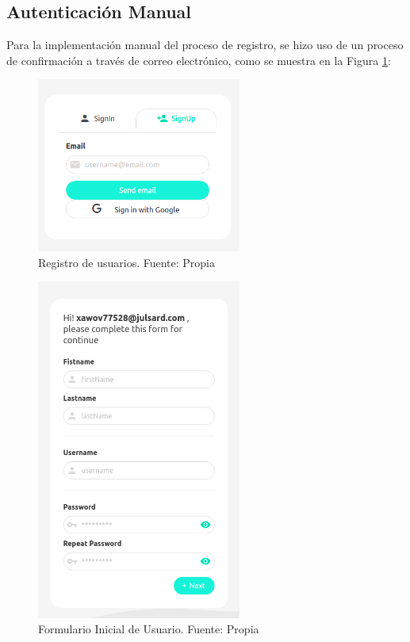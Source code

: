 \subsection{Autenticación Manual}

Para la implementación manual del proceso de registro, se hizo uso de un proceso de confirmación a través de correo electrónico, como se muestra en la Figura \ref{figure:signup}:


\begin{figure}[H]
\centering
\includegraphics[width=0.60\textwidth]{img/16.png}
\caption{Registro de usuarios. Fuente: Propia}
\label{figure:signup}
\end{figure}


\begin{figure}[H]
\centering
\includegraphics[width=0.60\textwidth]{img/17.png}
\caption{
Formulario Inicial de Usuario. Fuente: Propia}
\label{figure:initialForm}
\end{figure}

